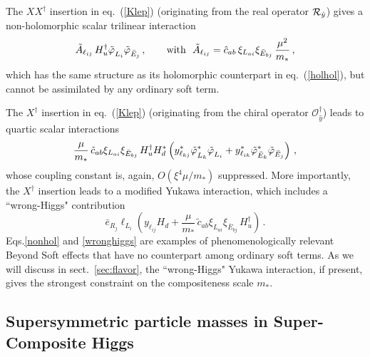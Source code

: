\documentclass[a4paper,12pt]{article}
\newcommand{\beq}{\begin{equation}}
\newcommand{\eeq}{\end{equation}}
\def\eq#1{eq.~(\ref{#1})}
\def\eq#1{eq.~(\ref{#1})}
\def\sec#1{sect.~\ref{#1}}
\def\O{\mathcal{O}}
\def\mst{m_*}
\def\scalar#1{{\tilde \varphi}_{\raisebox{-2pt}{$\scriptstyle {#1}$}}}
\begin{document}
The $XX^\dagger$ insertion in \eq{Klep} (originating from the real operator ${\cal R}_{\hat y}$) gives a non-holomorphic scalar trilinear interaction
\beq
{\tilde A}_{\ell_{ij}}\, H_u^\dagger \scalar{L_i} \scalar{{\bar E}_j} \, ,
~~~~~~\textrm{with}~~
{\tilde A}_{\ell_{ij}}={\hat c}_{ab}\, \xi_{L_{ai}}\xi_{{\bar E}_{bj}}\, \frac{\mu^2}{\mst} \, ,
\label{nonhol}
\eeq
which has the same structure as its holomorphic counterpart in \eq{holhol}, but cannot be assimilated by any ordinary soft term.

The $X^\dagger$ insertion in \eq{Klep} (originating from the chiral operator $\O^\dagger_{\hat y}$) leads to quartic scalar interactions
\beq
\frac{\mu}{\mst}\, {\tilde c}_{ab} \xi_{L_{ai}}\xi_{{\bar E}_{bj}}\, 
H_u^\dagger H_d^* \left( y^*_{\ell_{kj}} 
\scalar{L_k}^* \scalar{L_i} 
+ y^*_{\ell_{ik}} 
\scalar{{\bar E}_k}^*
\scalar{{\bar E}_j}
\right) \, ,
\eeq
whose coupling constant is, again, $O(\xi^4\mu/\mst)$ suppressed. More importantly, the $X^\dagger$ insertion leads to a modified Yukawa interaction, which includes a ``wrong-Higgs" contribution
\beq
{\bar e}_{R_j} \ell_{L_i} \left( y_{\ell_{ij}}H_d+ \frac{\mu}{\mst}\, {\tilde c}_{ab} \xi_{L_{ai}}\xi_{{\bar E}_{bj}}\, 
H_u^\dagger \right) \, .
\label{wronghiggs}
\eeq
Eqs.\eqref{nonhol} and \eqref{wronghiggs} are examples of phenomenologically relevant Beyond Soft effects that have no counterpart among ordinary soft terms.
As we will discuss in \sec{sec:flavor}, the ``wrong-Higgs" Yukawa interaction, if present, gives the strongest constraint on the compositeness scale $\mst$.

\subsection{Supersymmetric particle masses in Super-Composite Higgs}
\end{document}
